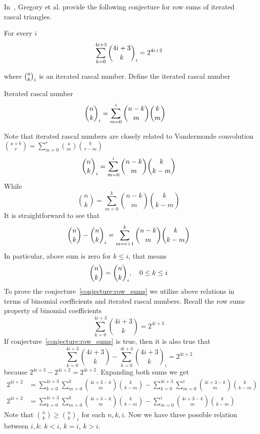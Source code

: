 In~\cite{gregory2023iterated}, Gregory et al.
provide the following conjecture for row sums of iterated rascal triangles.
\begin{conjecture}
    \label{conjecture:row_sums}
    For every $i$
    \begin{align*}
        \sum_{k=0}^{4i+3} \binom{4i+3}{k}_{i} = 2^{4i+2}
    \end{align*}
\end{conjecture}
where $\binom{n}{k}_{i}$ is an iterated rascal number.
Define the iterated rascal number
\begin{definition}
    Iterated rascal number
    \begin{align*}
        \binom{n}{k}_{i} &= \sum_{m=0}^{i} \binom{n-k}{m} \binom{k}{m}
    \end{align*}
\end{definition}
Note that iterated rascal numbers are closely related to Vandermonde convolution
$\binom{a+b}{r} = \sum_{m=0}^{r} \binom{a}{m} \binom{b}{r-m}$
\begin{equation*}
    \binom{n}{k}_{i} = \sum_{m=0}^{i} \binom{n-k}{m} \binom{k}{k-m}
\end{equation*}
While
\begin{equation*}
    \binom{n}{k}= \sum_{m=0}^{k} \binom{n-k}{m} \binom{k}{k-m}
\end{equation*}
It is straightforward to see that
\begin{equation*}
    \binom{n}{k} - \binom{n}{k}_{i} = \sum_{m=i+1}^{k} \binom{n-k}{m} \binom{k}{k-m}
\end{equation*}
In particular, above sum is zero for $k \leq i$, that means
\begin{equation*}
    \binom{n}{k} = \binom{n}{k}_{i}, \quad  0 \leq k \leq i
\end{equation*}
To prove the conjecture~\eqref{conjecture:row_sums}
we utilize above relations in terms of binomial coefficients and iterated rascal numbers.
Recall the row sums property of binomial coefficients
\begin{equation*}
    \sum_{k=0}^{4i+3} \binom{4i+3}{k} = 2^{4i+3}
\end{equation*}
If conjecture~\eqref{conjecture:row_sums} is true, then it is also true that
\begin{equation*}
     \sum_{k=0}^{4i+3} \binom{4i+3}{k} -  \sum_{k=0}^{4i+3} \binom{4i+3}{k}_i = 2^{4i+2}
\end{equation*}
because $2^{4i+3} - 2^{4i+2} = 2^{4i+2}$.
Expanding both sums we get
\begin{align*}
    2^{4i+2} &= \sum_{k=0}^{4i+3} \sum_{m=0}^{k} \binom{4i+3-k}{m} \binom{k}{k-m} - \sum_{k=0}^{4i+3} \sum_{m=0}^{i} \binom{4i+3-k}{m} \binom{k}{k-m}\\
    2^{4i+2} &= \sum_{k=0}^{4i+3} \sum_{m=0}^{k} \binom{4i+3-k}{m} \binom{k}{k-m} - \sum_{m=0}^{i} \binom{4i+3-k}{m} \binom{k}{k-m}
\end{align*}
Note that $\binom{n}{k} \geq \binom{n}{k}_i$ for each $n,k,i$.
Now we have three possible relation between $i,k$: $k < i$, $k = i$, $k > i$.

